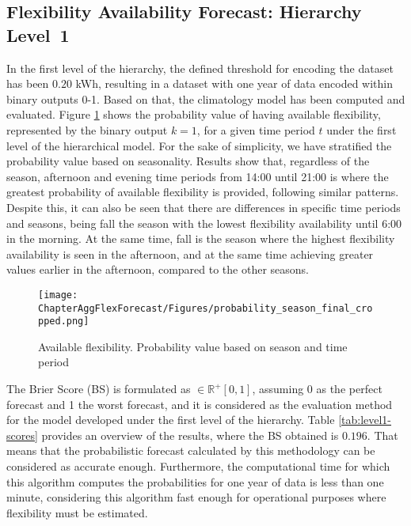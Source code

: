\subsection{Flexibility Availability Forecast: Hierarchy Level~1} \label{Sect:ResultsLevel1}
In the first level of the hierarchy, the defined threshold for encoding the dataset has been $0.20$ kWh, resulting in a dataset with one year of data encoded within binary outputs 0-1. Based on that, the climatology model has been computed and evaluated. 
Figure \ref{fig:LEVEL1-P_YEAR} shows the probability value of having available flexibility, represented by the binary output $k=1$, for a given time period $t$ under the first level of the hierarchical model. For the sake of simplicity, we have stratified the probability value based on seasonality. Results show that, regardless of the season, afternoon and evening time periods from 14:00 until 21:00 is where the greatest probability of available flexibility is provided, following similar patterns. Despite this, it can also be seen that there are differences in specific time periods and seasons, being fall the season with the lowest flexibility availability until 6:00 in the morning. At the same time, fall is the season where the highest flexibility availability is seen in the afternoon, and at the same time achieving greater values earlier in the afternoon, compared to the other seasons.   

\begin{figure}[htbp]
\centerline{\texttt{[image: ChapterAggFlexForecast/Figures/probability\_season\_final\_cropped.png]}}
\caption{Available flexibility. Probability value based on season and time period}
\label{fig:LEVEL1-P_YEAR}
\end{figure}

The Brier Score (BS) is formulated as $\in \mathbb{R}^+ [0,1]$, assuming 0 as the perfect forecast and 1 the worst forecast, and it is considered as the evaluation method for the model developed under the first level of the hierarchy. Table \ref{tab:level1-scores} provides an overview of the results, where the BS obtained is $0.196$. That means that the probabilistic forecast calculated by this methodology can be considered as accurate enough. Furthermore, the computational time for which this algorithm computes the probabilities for one year of data is less than one minute, considering this algorithm fast enough for operational purposes where flexibility must be estimated. 

